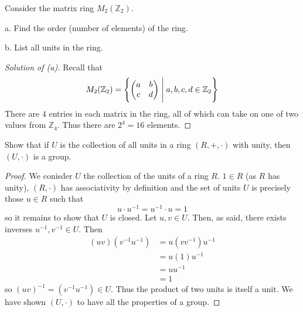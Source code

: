\begin{prob}
    Consider the matrix ring $M_2(\mathbb Z_2)$. 

    a. Find the order (number of elements) of the ring.

    b. List all units in the ring.
\end{prob}
\begin{proof}[Solution of (a)]
    Recall that 
    \[
        M_2(\mathbb Z_2) 
        =
        \left\{
        \begin{pmatrix}
            a & b \\ 
            c & d
        \end{pmatrix}
        \Biggm| 
        a,b,c,d \in \mathbb Z_2
        \right\}
    \]  
    There are $4$ entries in each matrix in the ring, all of which 
    can take on one of two values from $\mathbb Z_4$. Thus 
    there are $2^4 = 16$ elements. 
\end{proof}
\begin{prob}
    Show that if $U$ is the collection of all units in a ring  
    $(R,+,\cdot)$ with unity, then $(U,\cdot)$ is a group. 
\end{prob}
\begin{proof}
    We conisder $U$ the collection of the units of a ring 
    $R$. $1 \in R$ (as $R$ has unity), 
    $(R,\cdot)$ has associativity by definition and 
    the set of units $U$ is precisely those $u \in R$ such that 
    \[
        u \cdot u^{-1} = u^{-1} \cdot u = 1
    \]
    so it remains to show that $U$ is closed. 
    Let $u,v \in U$. Then, as said, there exists inverses 
    $u^{-1},v^{-1} \in U$. Then  
    \begin{align*}
        (uv)(v^{-1}u^{-1}) &= u(vv^{-1})u^{-1} \\ 
                           &= u(1)u^{-1} \\ 
                           &= uu^{-1} \\ 
                           &= 1
    \end{align*}
    so $(uv)^{-1} = (v^{-1}u^{-1}) \in U$. Thus the product 
    of two units is itself a unit. 
    We have shown $(U,\cdot)$ to have all the properties of 
    a group.
\end{proof}

